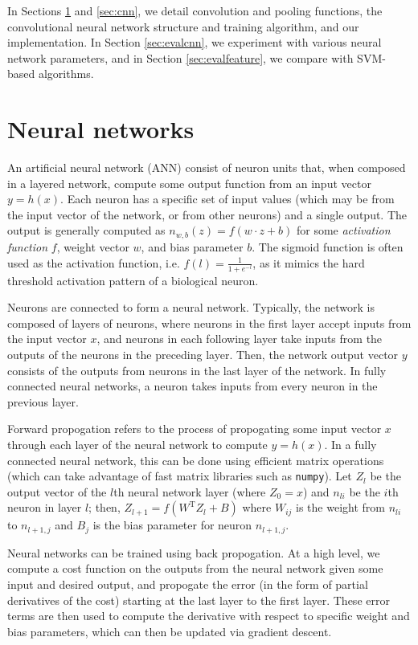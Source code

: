 \documentclass[10pt,twocolumn]{article}
\begin{document}
In Sections \ref{sec:neural} and \ref{sec:cnn}, we detail convolution and pooling functions, the convolutional neural network structure and training algorithm, and our implementation. In Section \ref{sec:evalcnn}, we experiment with various neural network parameters, and in Section \ref{sec:evalfeature}, we compare with SVM-based algorithms.

\section{Neural networks} \label{sec:neural}

An artificial neural network (ANN) consist of neuron units that, when composed in a layered network, compute some output function from an input vector $y = h(x)$. Each neuron has a specific set of input values (which may be from the input vector of the network, or from other neurons) and a single output. The output is generally computed as $n_{w, b}(z) = f(w \cdot z + b)$ for some \emph{activation function} $f$, weight vector $w$, and bias parameter $b$. The sigmoid function is often used as the activation function, i.e. $f(l) = \frac{1}{1+e^{-l}}$, as it mimics the hard threshold activation pattern of a biological neuron.

Neurons are connected to form a neural network. Typically, the network is composed of layers of neurons, where neurons in the first layer accept inputs from the input vector $x$, and neurons in each following layer take inputs from the outputs of the neurons in the preceding layer. Then, the network output vector $y$ consists of the outputs from neurons in the last layer of the network. In fully connected neural networks, a neuron takes inputs from every neuron in the previous layer.

Forward propogation refers to the process of propogating some input vector $x$ through each layer of the neural network to compute $y = h(x)$. In a fully connected neural network, this can be done using efficient matrix operations (which can take advantage of fast matrix libraries such as \texttt{numpy}). Let $Z_l$ be the output vector of the $l$th neural network layer (where $Z_0 = x$) and $n_{li}$ be the $i$th neuron in layer $l$; then, $Z_{l+1} = f(W^{\text{T}} Z_l + B)$ where $W_{ij}$ is the weight from $n_{li}$ to $n_{l+1,j}$ and $B_j$ is the bias parameter for neuron $n_{l+1,j}$.

Neural networks can be trained using back propogation. At a high level, we compute a cost function on the outputs from the neural network given some input and desired output, and propogate the error (in the form of partial derivatives of the cost) starting at the last layer to the first layer. These error terms are then used to compute the derivative with respect to specific weight and bias parameters, which can then be updated via gradient descent.
\end{document}
